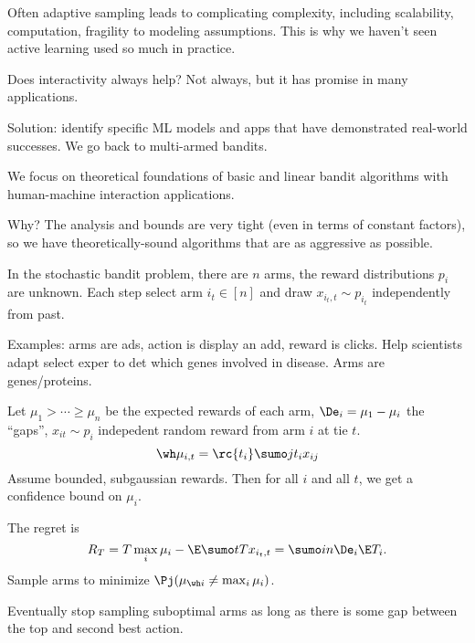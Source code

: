 Often adaptive sampling leads to complicating complexity, including scalability, computation, fragility to modeling assumptions. %
This is why we haven't seen active learning used so much in practice.

Does interactivity always help? Not always, but it has promise in many applications. 

Solution: identify specific ML models and apps that have demonstrated real-world successes. We go back to multi-armed bandits.

We focus on theoretical foundations of basic and linear bandit algorithms with human-machine interaction applications.

Why? The analysis and bounds are very tight (even in terms of constant factors), so we have theoretically-sound algorithms that are as aggressive as possible.

In the stochastic bandit problem, there are $n$ arms, the reward distributions $p_i$ are unknown. Each step select arm $i_t\in [n]$ and draw $x_{i_t,t}\sim p_{i_t}$ independently from past.

Examples: arms are ads, action is display an add, reward is clicks.
Help scientists adapt select exper to det which genes involved in disease. Arms are genes/proteins. %

Let $\mu_1>\cdots \ge \mu_n$ be the expected rewards of each arm, $\De_i = \mu_1-\mu_i$ the ``gaps'', $x_{it}\sim p_i$ indepedent random reward from arm $i$ at tie $t$.
$$
\wh \mu_{i,t} = \rc{t_i}\sumo j{t_i}x_{ij}
$$
Assume bounded, subgaussian rewards. Then for all $i$ and all $t$, we get a confidence bound on $\mu_i$.

The regret is 
$$
R_T = T\max_i\mu_i - \E\sumo tT x_{i_t, t} = \sumo in \De_i \E T_i.
$$
Sample arms to minimize $\Pj(\mu_{\wh i} \ne \max_i\mu_i)$. %


Eventually stop sampling suboptimal arms as long as there is some gap between the top and second best action.

